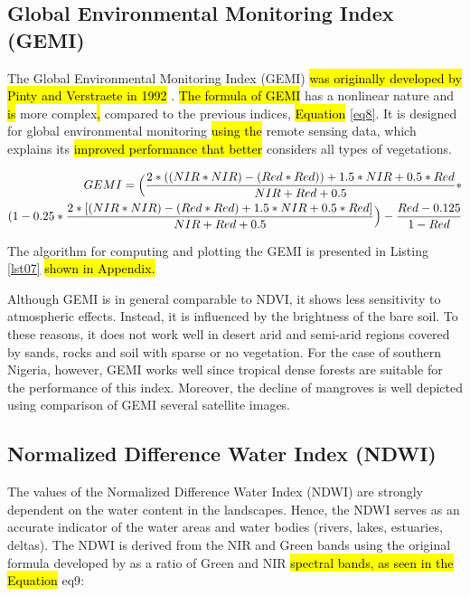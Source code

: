 \documentclass[jmse,article,submit,pdftex,moreauthors]{Definitions/mdpi}
\begin{document}
\subsection{Global Environmental Monitoring Index (GEMI)}

The Global Environmental Monitoring Index (GEMI) \hl{was originally developed by Pinty and Verstraete in 1992} \cite{PintyVerstraete}. \hl{The formula of GEMI }has a nonlinear nature and \hl{is} more complex\hl{, }compared to the previous indices, \hl{Equation }\ref{eq8}. It is designed for global environmental monitoring \hl{using the }remote sensing data, which explains its \hl{improved performance that better }considers all types of vegetations. 

\begin{align}
GEMI = \Bigl( \frac{2*((NIR * NIR)-(Red * Red)) + 1.5*NIR+0.5*Red}{NIR + Red + 0.5} * \nonumber\\
        (1 - 0.25 * \frac{2*[(NIR * NIR)-(Red * Red) + 1.5*NIR+0.5*Red]}{NIR + Red + 0.5} \Bigr ) - \frac{Red - 0.125}{1 - Red} \label{eq8}
\end{align}

The algorithm for computing and plotting the GEMI is presented in Listing \ref{lst07}\hl{ shown in Appendix.}

Although GEMI is in general comparable to NDVI, it shows less sensitivity to atmospheric effects. Instead, it is influenced by the brightness of the bare soil. To these reasons, it does not work well in desert arid and semi-arid regions covered by sands, rocks and soil with sparse or no vegetation. For the case of southern Nigeria, however, GEMI works well since tropical dense forests are suitable for the performance of this index. Moreover, the decline of mangroves is well depicted using comparison of GEMI several satellite images.

\subsection{Normalized Difference Water Index (NDWI)}

The values of the Normalized Difference Water Index (NDWI) are strongly dependent on the water content in the landscapes. Hence, the NDWI serves as an accurate indicator of the water areas and water bodies (rivers, lakes, estuaries, deltas). The NDWI is derived from the NIR and Green bands using the original formula developed by \cite{McFeeters} as a ratio of Green and NIR \hl{spectral bands, as seen in the Equation }{eq9}: 
\end{document}
